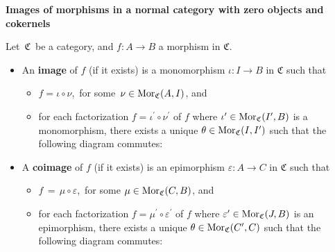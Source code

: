 
\vskip 1.0cm
\noindent
\textbf{\large Images of morphisms in a normal category with zero objects and cokernels}


\vskip 0.5cm
\begin{definition}
\mbox{}
\vskip 0.15cm
\noindent
Let \,$\mathfrak{C}$\, be a category, and $f : A \longrightarrow B$ a morphism in $\mathfrak{C}$.
\begin{itemize}
\item
	\vskip -0.1cm
	An \textbf{image} of $f$ (if it exists) is a monomorphism $\iota : I \longrightarrow B$ in $\mathfrak{C}$ such that
	\begin{itemize}
	\item
		$f = \iota \circ \nu$,\, for some \,$\nu \in \textnormal{Mor}_{\mathfrak{C}}(A,I)$, and
	\item
		for each factorization $f = \iota^{\prime} \circ \nu^{\prime}$ of $f$
		where $\iota^{\prime} \in \textnormal{Mor}_{\mathfrak{C}}(I^{\prime},B)$ is a monomorphism,
		there exists a unique $\theta \in \textnormal{Mor}_{\mathfrak{C}}(I,I^{\prime})$ such that the following diagram commutes:
		\begin{center}
		\end{center}
	\end{itemize}
\item
	A \textbf{coimage} of $f$ (if it exists) is an epimorphism $\varepsilon : A \longrightarrow C$ in $\mathfrak{C}$ such that
	\begin{itemize}
	\item
		$f \,=\, \mu \circ \varepsilon$,\, for some $\mu \in \textnormal{Mor}_{\mathfrak{C}}(C,B)$, and
	\item
		for each factorization $f = \mu^{\prime} \circ \varepsilon^{\prime}$ of $f$
		where $\varepsilon^{\prime} \in \textnormal{Mor}_{\mathfrak{C}}(J,B)$ is an epimorphism,
		there exists a unique $\theta \in \textnormal{Mor}_{\mathfrak{C}}(C^{\prime},C)$ such that the following diagram commutes:

\end{itemize}
\end{itemize}
\end{definition}
